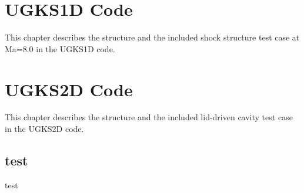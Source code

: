\documentclass[a4paper]{book}
\begin{document}
\chapter{UGKS1D Code}
This chapter describes the structure and the included shock structure test case at Ma=8.0 in the UGKS1D code.

\chapter{UGKS2D Code}
This chapter describes the structure and the included lid-driven cavity test case in the UGKS2D code.
\section{test}
test

\backmatter

\end{document}
